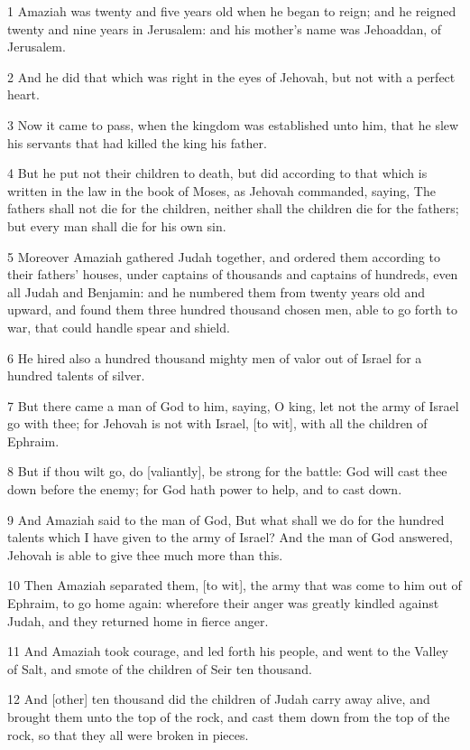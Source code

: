 \par 1 Amaziah was twenty and five years old when he began to reign; and he reigned twenty and nine years in Jerusalem: and his mother's name was Jehoaddan, of Jerusalem.
\par 2 And he did that which was right in the eyes of Jehovah, but not with a perfect heart.
\par 3 Now it came to pass, when the kingdom was established unto him, that he slew his servants that had killed the king his father.
\par 4 But he put not their children to death, but did according to that which is written in the law in the book of Moses, as Jehovah commanded, saying, The fathers shall not die for the children, neither shall the children die for the fathers; but every man shall die for his own sin.
\par 5 Moreover Amaziah gathered Judah together, and ordered them according to their fathers' houses, under captains of thousands and captains of hundreds, even all Judah and Benjamin: and he numbered them from twenty years old and upward, and found them three hundred thousand chosen men, able to go forth to war, that could handle spear and shield.
\par 6 He hired also a hundred thousand mighty men of valor out of Israel for a hundred talents of silver.
\par 7 But there came a man of God to him, saying, O king, let not the army of Israel go with thee; for Jehovah is not with Israel, [to wit], with all the children of Ephraim.
\par 8 But if thou wilt go, do [valiantly], be strong for the battle: God will cast thee down before the enemy; for God hath power to help, and to cast down.
\par 9 And Amaziah said to the man of God, But what shall we do for the hundred talents which I have given to the army of Israel? And the man of God answered, Jehovah is able to give thee much more than this.
\par 10 Then Amaziah separated them, [to wit], the army that was come to him out of Ephraim, to go home again: wherefore their anger was greatly kindled against Judah, and they returned home in fierce anger.
\par 11 And Amaziah took courage, and led forth his people, and went to the Valley of Salt, and smote of the children of Seir ten thousand.
\par 12 And [other] ten thousand did the children of Judah carry away alive, and brought them unto the top of the rock, and cast them down from the top of the rock, so that they all were broken in pieces.
